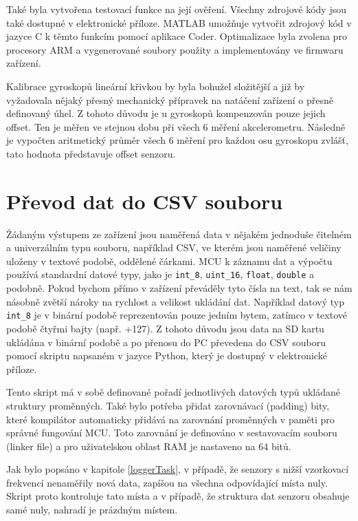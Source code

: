 Také byla vytvořena testovací funkce na její ověření. Všechny zdrojové kódy jsou také dostupné v elektronické příloze. MATLAB umožňuje vytvořit zdrojový kód v jazyce C k těmto funkcím pomocí aplikace Coder. Optimalizace byla zvolena pro procesory ARM a vygenerované soubory použity a implementovány ve firmwaru zařízení. 

Kalibrace gyroskopů lineární křivkou by byla bohužel složitější a již by vyžadovala nějaký přesný mechanický přípravek na natáčení zařízení o přesně definovaný úhel. Z tohoto důvodu je u gyroskopů kompenzován pouze jejich offset. Ten je měřen ve stejnou dobu při všech 6 měření akcelerometru. Následně je vypočten aritmetický průměr všech 6 měření pro každou osu gyroskopu zvlášť, tato hodnota představuje offset senzoru.

\section{Převod dat do CSV souboru}
Žádaným výstupem ze zařízení jsou naměřená data v nějakém jednoduše čitelném a univerzálním typu souboru, například \ac{CSV}, ve kterém jsou naměřené veličiny uloženy v textové podobě, oddělené čárkami. \ac{MCU} k záznamu dat a výpočtu používá standardní datové typy, jako je \texttt{int\_8}, \texttt{uint\_16}, \texttt{float}, \texttt{double} a podobně. Pokud bychom přímo v zařízení převáděly tyto čísla na text, tak se nám násobně zvětší nároky na rychlost a velikost ukládání dat. Například datový typ \texttt{int\_8} je v binární podobě reprezentován pouze jedním bytem, zatímco v textové podobě čtyřmi bajty (např. +127). Z tohoto důvodu jsou data na SD kartu ukládána v binární podobě a po přenosu do PC převedena do \ac{CSV} souboru pomocí skriptu napsaném v jazyce Python, který je dostupný v elektronické příloze.

Tento skript má v sobě definované pořadí jednotlivých datových typů ukládané struktury proměnných. Také bylo potřeba přidat zarovnávací (padding) bity, které kompilátor automaticky přidává na zarovnání proměnných v paměti pro správné fungování MCU. Toto zarovnání je definováno v sestavovacím souboru (linker file) a pro uživatelskou oblast RAM je nastaveno na 64 bitů.

Jak bylo popsáno v kapitole \ref{loggerTask}, v případě, že senzory s nižší vzorkovací frekvencí nenaměřily nová data, zapíšou na všechna odpovídající místa nuly. Skript proto kontroluje tato místa a v případě, že struktura dat senzoru obsahuje samé nuly, nahradí je prázdným místem.




